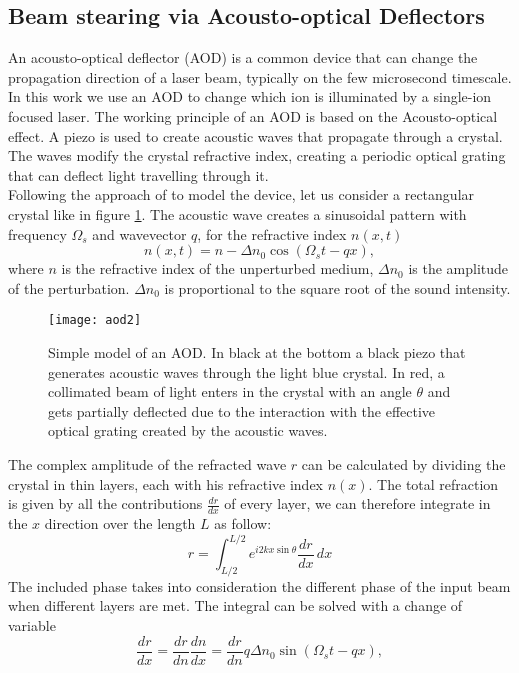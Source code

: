 \subsection{Beam stearing via Acousto-optical Deflectors}
\label{theory_AOD}
An acousto-optical deflector (AOD) is a common device that can change the propagation direction of a laser beam, typically on the few microsecond timescale. In this work we use an AOD to change which ion is illuminated by a single-ion focused laser. The working principle of an AOD is based on the Acousto-optical effect. A piezo is used to create acoustic waves that propagate through a crystal. The waves modify the crystal refractive index, creating a periodic optical grating that can deflect light travelling through it.  \\
Following the approach of \cite{saleh} to model the device, let us consider a rectangular crystal like in figure \ref{AOD}. The acoustic wave creates a sinusoidal pattern with frequency $\Omega_s$ and wavevector $q$, for the refractive index $n(x,t)$
\begin{equation}
n(x,t) = n - \Delta n_0 \cos \left(\Omega_s t - qx \right),
\end{equation}
where $n$ is the refractive index of the unperturbed medium, $\Delta n_0$ is the amplitude of the perturbation. $\Delta n_0$ is proportional to the square root of the sound intensity.
\begin{figure}[H]
\centering
\texttt{[image: aod2]}
\caption{Simple model of an AOD. In black at the bottom a black piezo that generates acoustic waves through the light blue crystal. In red, a collimated beam of light enters in the crystal with an angle $\theta$ and gets partially deflected due to the interaction with the effective optical grating created by the acoustic waves.}
\label{AOD}
\end{figure}
The complex amplitude of the refracted wave $r$ can be calculated by dividing the crystal in thin layers, each with his refractive index $n(x)$. The total refraction is given by all the contributions $\frac{dr}{dx}$ of every layer, we can therefore integrate in the $x$ direction over the length $L$ as follow:
\begin{equation}
r = \int_{L/2}^{L/2} e^{i2kx \sin\theta} \frac{dr}{dx} \,dx
\end{equation}
The included phase takes into consideration the different phase of the input beam when different layers are met. The integral can be solved with a change of variable
\begin{equation}
\frac{dr}{dx} = \frac{dr}{dn}\frac{dn}{dx} = \frac{dr}{dn} q \Delta n_0 \sin \left(\Omega_s t - qx \right),
\end{equation}
